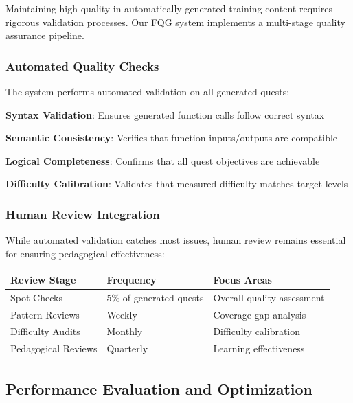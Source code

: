 Maintaining high quality in automatically generated training content requires rigorous validation processes. Our FQG system implements a multi-stage quality assurance pipeline.

\subsubsection*{Automated Quality Checks}

The system performs automated validation on all generated quests:

\begin{expandedlist}
    \item \textbf{Syntax Validation}: Ensures generated function calls follow correct syntax
    \item \textbf{Semantic Consistency}: Verifies that function inputs/outputs are compatible
    \item \textbf{Logical Completeness}: Confirms that all quest objectives are achievable
    \item \textbf{Difficulty Calibration}: Validates that measured difficulty matches target levels
\end{expandedlist}

\subsubsection*{Human Review Integration}

While automated validation catches most issues, human review remains essential for ensuring pedagogical effectiveness:

\begin{center}
\begin{tabular}{@{}lll@{}}
\toprule
\textbf{Review Stage} & \textbf{Frequency} & \textbf{Focus Areas} \\
\midrule
Spot Checks & 5\% of generated quests & Overall quality assessment \\
Pattern Reviews & Weekly & Coverage gap analysis \\
Difficulty Audits & Monthly & Difficulty calibration \\
Pedagogical Reviews & Quarterly & Learning effectiveness \\
\bottomrule
\end{tabular}
\end{center}

\subsection*{Performance Evaluation and Optimization}

